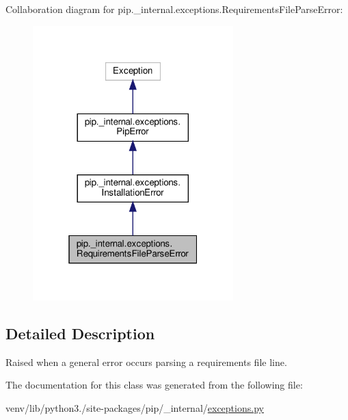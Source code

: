Collaboration diagram for pip.\+\_\+internal.\+exceptions.\+Requirements\+File\+Parse\+Error\+:
\nopagebreak
\begin{figure}[H]
\begin{center}
\leavevmode
\includegraphics[width=220pt]{classpip_1_1__internal_1_1exceptions_1_1RequirementsFileParseError__coll__graph}
\end{center}
\end{figure}


\subsection{Detailed Description}
\begin{DoxyVerb}Raised when a general error occurs parsing a requirements file line.\end{DoxyVerb}
 

The documentation for this class was generated from the following file\+:\begin{DoxyCompactItemize}
\item 
venv/lib/python3./site-\/packages/pip/\+\_\+internal/\hyperlink{pip_2__internal_2exceptions_8py}{exceptions.\+py}\end{DoxyCompactItemize}
